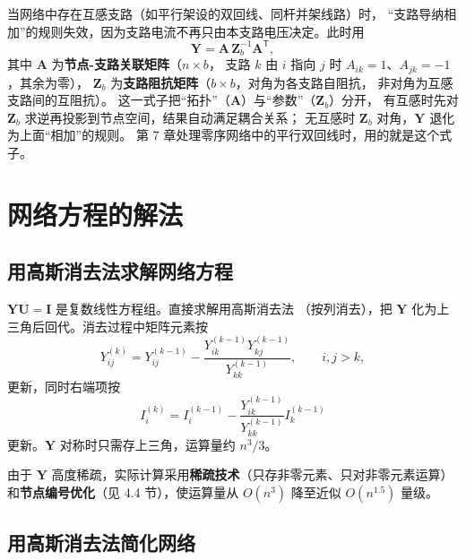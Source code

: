 当网络中存在互感支路（如平行架设的双回线、同杆并架线路）时，
“支路导纳相加”的规则失效，因为支路电流不再只由本支路电压决定。此时用
\begin{equation}
  \boldsymbol Y=\boldsymbol A\,\boldsymbol Z_b^{-1}\boldsymbol A^{\mathsf T},
\end{equation}
其中 $\boldsymbol A$ 为\textbf{节点-支路关联矩阵}（$n\times b$，
支路 $k$ 由 $i$ 指向 $j$ 时 $A_{ik}=1$、$A_{jk}=-1$，其余为零），
$\boldsymbol Z_b$ 为\textbf{支路阻抗矩阵}（$b\times b$，对角为各支路自阻抗，
非对角为互感支路间的互阻抗）。
这一式子把“拓扑”（$\boldsymbol A$）与“参数”（$\boldsymbol Z_b$）分开，
有互感时先对 $\boldsymbol Z_b$ 求逆再投影到节点空间，结果自动满足耦合关系；
无互感时 $\boldsymbol Z_b$ 对角，$\boldsymbol Y$ 退化为上面“相加”的规则。
第 7 章处理零序网络中的平行双回线时，用的就是这个式子。

\section{网络方程的解法}

\subsection{用高斯消去法求解网络方程}

$\boldsymbol Y\boldsymbol U=\boldsymbol I$ 是复数线性方程组。直接求解用高斯消去法
（按列消去），把 $\boldsymbol Y$ 化为上三角后回代。消去过程中矩阵元素按
\begin{equation}
  Y_{ij}^{(k)}=Y_{ij}^{(k-1)}-\frac{Y_{ik}^{(k-1)}Y_{kj}^{(k-1)}}{Y_{kk}^{(k-1)}},
  \qquad i,j>k,
\end{equation}
更新，同时右端项按
\begin{equation}
  I_i^{(k)}=I_i^{(k-1)}-\frac{Y_{ik}^{(k-1)}}{Y_{kk}^{(k-1)}}I_k^{(k-1)}
\end{equation}
更新。$\boldsymbol Y$ 对称时只需存上三角，运算量约 $n^3/3$。

由于 $\boldsymbol Y$ 高度稀疏，实际计算采用\textbf{稀疏技术}（只存非零元素、只对非零元素运算）
和\textbf{节点编号优化}（见 4.4 节），使运算量从 $O(n^3)$ 降至近似 $O(n^{1.5})$ 量级。

\subsection{用高斯消去法简化网络}

